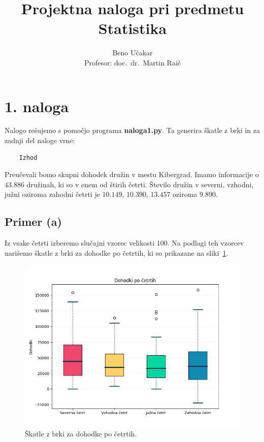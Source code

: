 \documentclass[a4paper,11pt]{article}
\begin{document}
\title{Projektna naloga pri predmetu Statistika}
\author{Beno Učakar \\ Profesor: doc.~dr.~Martin Raič}
\date{}


\maketitle


\section*{1. naloga}

Nalogo rešujemo s pomočjo programa \textbf{naloga1.py}. 
Ta generira škatle z brki in za zadnji del naloge vrne:

\begin{verbatim}
    Izhod
\end{verbatim}

Preučevali bomo skupni dohodek družin v mestu Kibergrad.
Imamo informacije o $43.886$ družinah, ki so v enem od štirih četrti. 
Število družin v severni, vzhodni, južni oziroma zahodni četrti je $10.149$, $10.390$, $13.457$ oziroma $9.890$.

\subsection*{Primer (a)}

Iz vsake četrti izberemo slučajni vzorec velikosti $100$. 
Na podlagi teh vzorcev narišemo škatle z brki za dohodke po četrtih, ki so prikazane na sliki~\ref{brke_po_cetrtih}.

\begin{figure}[H]
    \centering
    \includegraphics[scale=0.7]{Skatle_z_brki_Cetrti.png}
    \caption{Škatle z brki za dohodke po četrtih.}
    \label{brke_po_cetrtih}
\end{figure}
\end{document}

